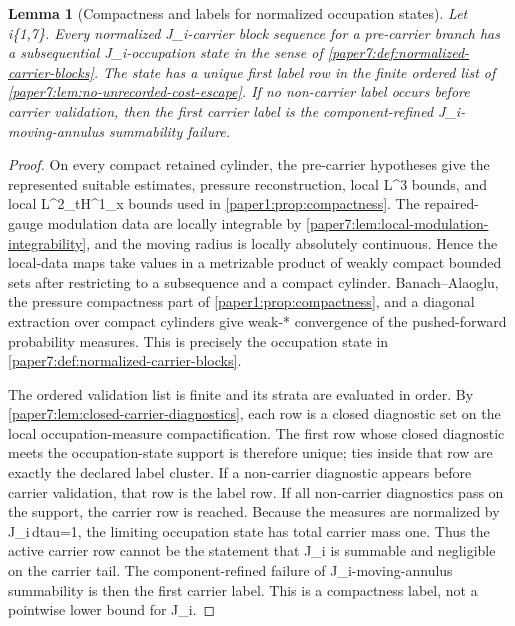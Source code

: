 \documentclass[11pt]{amsart}
\def\({}%
\def\){}%
\def\tau{tau}%
\theoremstyle{plain}
\newtheorem{lemma}[lemma]{Lemma}
\theoremstyle{definition}
\theoremstyle{remark}
\begin{document}
\begin{lemma}[Compactness and labels for normalized occupation states]
\label{paper7:lem:carrier-state-compactness-labels}
Let \(i\in\{1,7\}\).  Every normalized \(J_i\)-carrier block sequence for a
pre-carrier branch has a subsequential \(J_i\)-occupation state in the sense of
\cref{paper7:def:normalized-carrier-blocks}.  The state has a unique first
label row in the finite ordered list of
\cref{paper7:lem:no-unrecorded-cost-escape}.  If no non-carrier label occurs
before carrier validation, then the first carrier label is the
component-refined \(J_i\)-moving-annulus summability failure.
\end{lemma}

\begin{proof}
On every compact retained cylinder, the pre-carrier hypotheses give the
represented suitable estimates, pressure reconstruction, local \(L^3\) bounds,
and local \(L^2_tH^1_x\) bounds used in
\cref{paper1:prop:compactness}.  The repaired-gauge modulation data are locally
integrable by \cref{paper7:lem:local-modulation-integrability}, and the moving
radius is locally absolutely continuous.  Hence the local-data maps take values
in a metrizable product of weakly compact bounded sets after restricting to a
subsequence and a compact cylinder.  Banach--Alaoglu, the pressure compactness
part of \cref{paper1:prop:compactness}, and a diagonal extraction over compact
cylinders give weak-\(*\) convergence of the pushed-forward probability
measures.  This is precisely the occupation state in
\cref{paper7:def:normalized-carrier-blocks}.
\par
The ordered validation list is finite and its strata are evaluated in order.
By \cref{paper7:lem:closed-carrier-diagnostics}, each row is a closed
diagnostic set on the local occupation-measure compactification.  The first row
whose closed diagnostic meets the occupation-state support is therefore unique;
ties inside that row are exactly the declared label cluster.  If a
non-carrier diagnostic appears before carrier validation, that row is the
label row.  If all non-carrier diagnostics pass on the support, the carrier
row is reached.  Because the measures are normalized by
\(\int J_i\,d\tau=1\), the limiting occupation state has total carrier mass
one.  Thus the active carrier row cannot be the statement that \(J_i\) is
summable and negligible on the carrier tail.  The component-refined failure of
\(J_i\)-moving-annulus summability is then the first carrier label.  This is a
compactness label, not a pointwise lower bound for \(J_i\).
\end{proof}
\end{document}
